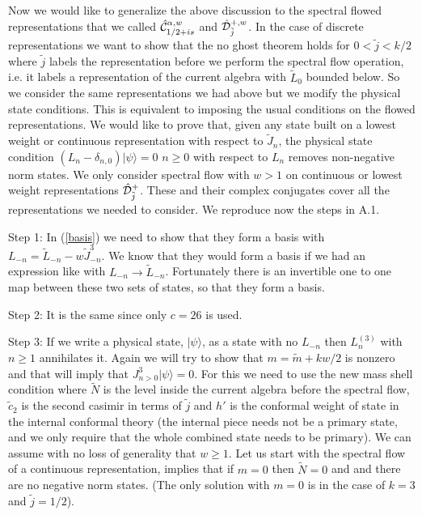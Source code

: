 Now we would like to generalize the above discussion to 
the spectral flowed   representations that we called 
$\hat {\cal C}^{\alpha, w}_{1/2 + is} $ and $\hat {\cal D}^{+,w}_{\tilde j}$.
In the case of discrete representations we want to show that the
no ghost theorem holds for $0 < \tilde j < k/2$ where $\tilde j$ labels 
the representation before we perform the spectral flow operation, i.e.
it labels a representation of the current algebra with $\tilde L_0$
 bounded below. 
So we consider the same representations we had above but we
 modify the physical state conditions. 
This is equivalent to imposing the usual conditions on the flowed 
representations. 
 We would like to prove that, given any state built on a
lowest weight or continuous representation with respect to
$\tilde{J}_n$, the physical state condition $(L_n -\delta_{n,0})
|\psi\rangle =0$ $n\geq 0$  with respect to $L_n$
removes non-negative norm states.
We only consider spectral flow with $w>1$ on continuous or 
lowest weight representations $\hat {\cal D}^+_{\tilde j}$. These and their 
complex conjugates cover all the representations we needed to consider.
We reproduce now the  steps in A.1.

\medskip
\noindent
Step 1:
In (\ref{basis}) we need to show that they form a basis with
 $L_{-n} =  \tilde L_{-n} 
- w \tilde J_{-n}^3$. We know that they would form a basis if we had
an expression like \basis with $L_{-n} \to \tilde L_{-n}$. Fortunately
there
is an invertible one to one map between these two sets of states, so that
they form a basis. 


\medskip
\noindent
Step 2: It is the same since only $c=26$ is used.

\medskip
\noindent
Step 3:
If we write a physical state, $|\psi\rangle$,
  as a state  with no $L_{-n}$ then
 $L^{(3)}_n  $ with $n\geq 1$
annihilates it. Again we will try to show that $m=
\tilde{m} + kw/2$ is
nonzero and that will imply that $J^3_{n>0} |\psi\rangle =0$.
For this we need to use the new mass shell condition
where $\tilde{N}$ is the level inside the current algebra before
the spectral flow, $\tilde c_2 $ is the second
casimir in terms of $\tilde j$  and $h'$ is the conformal
weight
of state in the internal  conformal theory 
(the internal piece needs not be a primary state,
and we only require that the whole combined state
needs to be primary).
We can assume with no loss of generality that $w\geq 1$.
Let us start with  the spectral flow of a continuous representation,  \newmass 
implies that if $m=0$ then $\tilde N=0$ 
and and there are no negative norm states.
(The only solution with $m=0$  is in the case of $k=3$ and $\tilde j=1/2$). 

